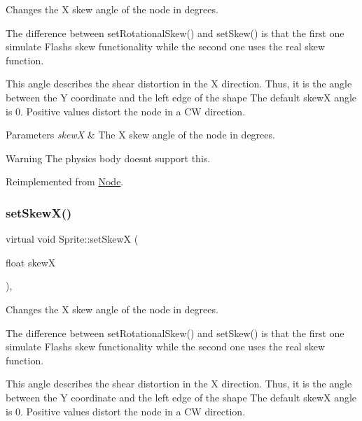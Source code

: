 Changes the X skew angle of the node in degrees.

The difference between {\ttfamily set\+Rotational\+Skew()} and {\ttfamily set\+Skew()} is that the first one simulate Flash\textquotesingle{}s skew functionality while the second one uses the real skew function.

This angle describes the shear distortion in the X direction. Thus, it is the angle between the Y coordinate and the left edge of the shape The default skewX angle is 0. Positive values distort the node in a CW direction.


\begin{DoxyParams}{Parameters}
{\em skewX} & The X skew angle of the node in degrees.\\
\hline
\end{DoxyParams}
\begin{DoxyWarning}{Warning}
The physics body doesn\textquotesingle{}t support this. 
\end{DoxyWarning}


Reimplemented from \hyperlink{classNode_a48cf4d7b304b57a3f593d9eecde3ac7f}{Node}.

\mbox{\label{classSprite_a975b779e48841943ebbe5147331fc8c2}} 
\subsubsection{\texorpdfstring{set\+Skew\+X()}{setSkewX()}\hspace{0.1cm}{\footnotesize\ttfamily [2/2]}}
{\footnotesize\ttfamily virtual void Sprite\+::set\+SkewX (\begin{DoxyParamCaption}\item[{float}]{skewX }\end{DoxyParamCaption})\hspace{0.3cm}{\ttfamily [override]}, {\ttfamily [virtual]}}

Changes the X skew angle of the node in degrees.

The difference between {\ttfamily set\+Rotational\+Skew()} and {\ttfamily set\+Skew()} is that the first one simulate Flash\textquotesingle{}s skew functionality while the second one uses the real skew function.

This angle describes the shear distortion in the X direction. Thus, it is the angle between the Y coordinate and the left edge of the shape The default skewX angle is 0. Positive values distort the node in a CW direction.


